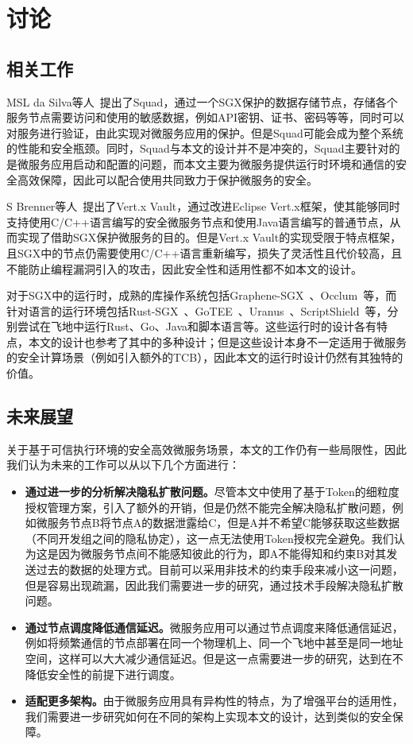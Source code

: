 \section{讨论}\label{sec:discussion}

\subsection{相关工作}

MSL da Silva等人~\cite{}提出了Squad，通过一个SGX保护的数据存储节点，存储各个服务节点需要访问和使用的敏感数据，例如API密钥、证书、密码等等，同时可以对服务进行验证，由此实现对微服务应用的保护。但是Squad可能会成为整个系统的性能和安全瓶颈。同时，Squad与本文的设计并不是冲突的，Squad主要针对的是微服务应用启动和配置的问题，而本文主要为微服务提供运行时环境和通信的安全高效保障，因此可以配合使用共同致力于保护微服务的安全。

S Brenner等人~\cite{}提出了Vert.x Vault，通过改进Eclipse Vert.x框架，使其能够同时支持使用C/C++语言编写的安全微服务节点和使用Java语言编写的普通节点，从而实现了借助SGX保护微服务的目的。但是Vert.x Vault的实现受限于特点框架，且SGX中的节点仍需要使用C/C++语言重新编写，损失了灵活性且代价较高，且不能防止编程漏洞引入的攻击，因此安全性和适用性都不如本文的设计。

对于SGX中的运行时，成熟的库操作系统包括Graphene-SGX~\cite{}、Occlum~\cite{}等，而针对语言的运行环境包括Rust-SGX~\cite{}、GoTEE~\cite{}、Uranus~\cite{}、ScriptShield~\cite{}等，分别尝试在飞地中运行Rust、Go、Java和脚本语言等。这些运行时的设计各有特点，本文的设计也参考了其中的多种设计；但是这些设计本身不一定适用于微服务的安全计算场景（例如引入额外的TCB），因此本文的运行时设计仍然有其独特的价值。

\subsection{未来展望}

关于基于可信执行环境的安全高效微服务场景，本文的工作仍有一些局限性，因此我们认为未来的工作可以从以下几个方面进行：

\begin{itemize}
    \item \textbf{通过进一步的分析解决隐私扩散问题。}尽管本文中使用了基于Token的细粒度授权管理方案，引入了额外的开销，但是仍然不能完全解决隐私扩散问题，例如微服务节点B将节点A的数据泄露给C，但是A并不希望C能够获取这些数据（不同开发组之间的隐私协定），这一点无法使用Token授权完全避免。我们认为这是因为微服务节点间不能感知彼此的行为，即A不能得知和约束B对其发送过去的数据的处理方式。目前可以采用非技术的约束手段来减小这一问题，但是容易出现疏漏，因此我们需要进一步的研究，通过技术手段解决隐私扩散问题。
    \item \textbf{通过节点调度降低通信延迟。}微服务应用可以通过节点调度来降低通信延迟，例如将频繁通信的节点部署在同一个物理机上、同一个飞地中甚至是同一地址空间，这样可以大大减少通信延迟。但是这一点需要进一步的研究，达到在不降低安全性的前提下进行调度。
    \item \textbf{适配更多架构。}由于微服务应用具有异构性的特点，为了增强平台的适用性，我们需要进一步研究如何在不同的架构上实现本文的设计，达到类似的安全保障。
\end{itemize}
